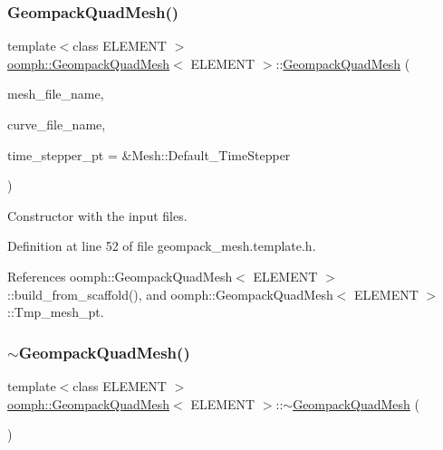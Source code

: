 \subsubsection{\texorpdfstring{Geompack\+Quad\+Mesh()}{GeompackQuadMesh()}}
{\footnotesize\ttfamily template$<$class E\+L\+E\+M\+E\+NT $>$ \\
\hyperlink{classoomph_1_1GeompackQuadMesh}{oomph\+::\+Geompack\+Quad\+Mesh}$<$ E\+L\+E\+M\+E\+NT $>$\+::\hyperlink{classoomph_1_1GeompackQuadMesh}{Geompack\+Quad\+Mesh} (\begin{DoxyParamCaption}\item[{const std\+::string \&}]{mesh\+\_\+file\+\_\+name,  }\item[{const std\+::string \&}]{curve\+\_\+file\+\_\+name,  }\item[{Time\+Stepper $\ast$}]{time\+\_\+stepper\+\_\+pt = {\ttfamily \&Mesh\+:\+:Default\+\_\+TimeStepper} }\end{DoxyParamCaption})\hspace{0.3cm}{\ttfamily [inline]}}



Constructor with the input files. 



Definition at line 52 of file geompack\+\_\+mesh.\+template.\+h.



References oomph\+::\+Geompack\+Quad\+Mesh$<$ E\+L\+E\+M\+E\+N\+T $>$\+::build\+\_\+from\+\_\+scaffold(), and oomph\+::\+Geompack\+Quad\+Mesh$<$ E\+L\+E\+M\+E\+N\+T $>$\+::\+Tmp\+\_\+mesh\+\_\+pt.

\mbox{\label{classoomph_1_1GeompackQuadMesh_a7795c44ea2da182fbeffa30808481ffb}} 
\subsubsection{\texorpdfstring{$\sim$\+Geompack\+Quad\+Mesh()}{~GeompackQuadMesh()}}
{\footnotesize\ttfamily template$<$class E\+L\+E\+M\+E\+NT $>$ \\
\hyperlink{classoomph_1_1GeompackQuadMesh}{oomph\+::\+Geompack\+Quad\+Mesh}$<$ E\+L\+E\+M\+E\+NT $>$\+::$\sim$\hyperlink{classoomph_1_1GeompackQuadMesh}{Geompack\+Quad\+Mesh} (\begin{DoxyParamCaption}{ }\end{DoxyParamCaption})\hspace{0.3cm}{\ttfamily [inline]}}



